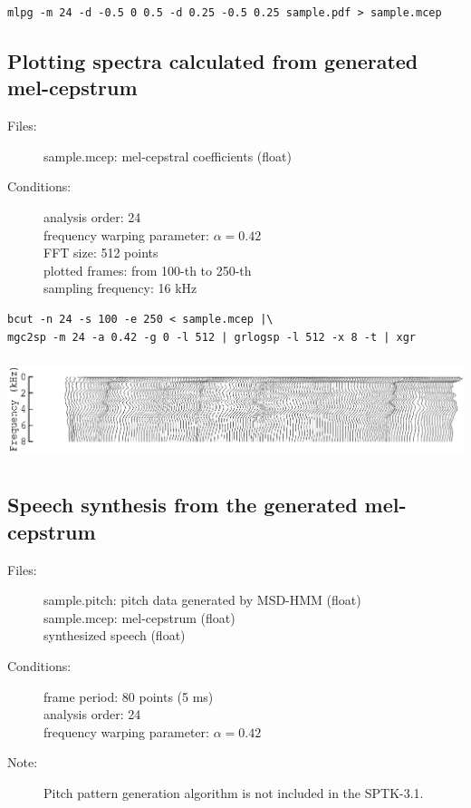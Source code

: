 \documentclass[a4paper,10pt]{article}
\begin{document}
\begin{verbatim}
mlpg -m 24 -d -0.5 0 0.5 -d 0.25 -0.5 0.25 sample.pdf > sample.mcep
\end{verbatim}

\subsection{Plotting spectra calculated from generated mel-cepstrum}

\begin{description}
\item[Files:]
  sample.mcep: mel-cepstral coefficients (float)
\item[Conditions:]
  analysis order: 24\\
  frequency warping parameter: $\alpha = 0.42$\\
  FFT size: 512 points\\
  plotted frames: from 100-th to 250-th\\
  sampling frequency: 16 kHz
\end{description}

\begin{verbatim}
bcut -n 24 -s 100 -e 250 < sample.mcep |\
mgc2sp -m 24 -a 0.42 -g 0 -l 512 | grlogsp -l 512 -x 8 -t | xgr
\end{verbatim}

\includegraphics[height=3cm]{sample.mcep.grlogsp-t.eps}

\subsection{Speech synthesis from the generated mel-cepstrum}

\begin{description}
\item[Files:]
  sample.pitch: pitch data generated by MSD-HMM (float)\\
  sample.mcep: mel-cepstrum (float) \\
  synthesized speech (float)
\item[Conditions:]
  frame period: 80 points (5 ms)\\
  analysis order: 24\\
  frequency warping parameter: $\alpha = 0.42$
\item[Note:]
  Pitch pattern generation algorithm is not included in the SPTK-3.1.
\end{description}
\end{document}
